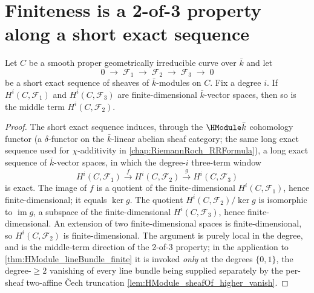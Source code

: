 \section{Finiteness is a 2-of-3 property along a short exact sequence}

\begin{lemma}

  \label{lem:HModule_finite_of_ses}
  Let \(C\) be a smooth proper geometrically irreducible curve over
  \(\bar k\) and let
  \[
    0 \;\longrightarrow\; \mathcal F_1 \;\longrightarrow\;
    \mathcal F_2 \;\longrightarrow\; \mathcal F_3 \;\longrightarrow\; 0
  \]
  be a short exact sequence of sheaves of \(\bar k\)-modules on \(C\). Fix
  a degree \(i\). If \(H^i(C, \mathcal F_1)\) and \(H^i(C, \mathcal F_3)\)
  are finite-dimensional \(\bar k\)-vector spaces, then so is the middle
  term \(H^i(C, \mathcal F_2)\).

\end{lemma}

\begin{proof}
  \leanok
  The short exact sequence induces, through the \(\HModule \bar k\)
  cohomology functor (a \(\delta\)-functor on the \(\bar k\)-linear abelian
  sheaf category; the same long exact sequence used for \(\chi\)-additivity
  in \cref{chap:RiemannRoch_RRFormula}), a long exact sequence of
  \(\bar k\)-vector spaces, in which the degree-\(i\) three-term window
  \[
    H^{i}(C, \mathcal F_1) \xrightarrow{\;f\;} H^{i}(C, \mathcal F_2)
      \xrightarrow{\;g\;} H^{i}(C, \mathcal F_3)
  \]
  is exact. The image of \(f\) is a quotient of the finite-dimensional
  \(H^i(C, \mathcal F_1)\), hence finite-dimensional; it equals
  \(\ker g\). The quotient \(H^i(C, \mathcal F_2)/\ker g\) is isomorphic
  to \(\operatorname{im} g\), a subspace of the finite-dimensional
  \(H^i(C, \mathcal F_3)\), hence finite-dimensional. An extension of
  two finite-dimensional spaces is finite-dimensional, so
  \(H^i(C, \mathcal F_2)\) is finite-dimensional. The argument is purely
  local in the degree, and is the middle-term direction of the 2-of-3
  property; in the application to \cref{thm:HModule_lineBundle_finite} it
  is invoked \emph{only} at the degrees \(\{0, 1\}\), the degree-\(\ge 2\)
  vanishing of every line bundle being supplied separately by the
  per-sheaf two-affine Čech truncation
  \cref{lem:HModule_sheafOf_higher_vanish}.
\end{proof}

